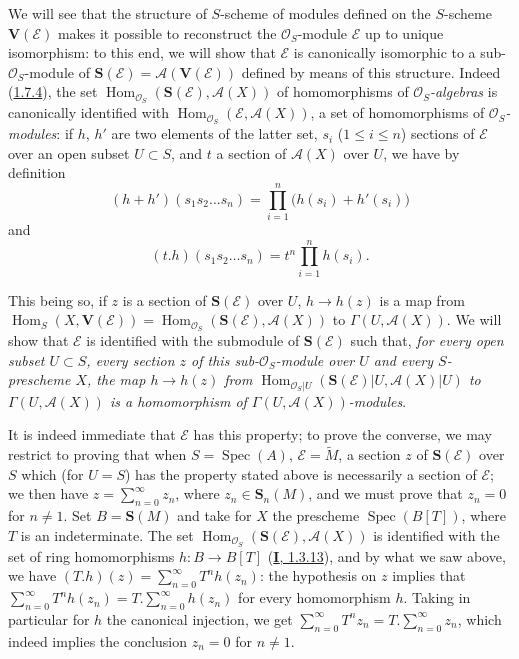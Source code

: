 \begin{env}[1.7.14]
\label{II.1.7.14}
We will see that the structure of $S$-scheme of modules defined on the
$S$-scheme $\mathbf{V}(\mathcal{E})$ makes it possible to reconstruct the
$\mathcal{O}_S$-module $\mathcal{E}$ up to unique isomorphism: to this
end, we will show that $\mathcal{E}$ is canonically isomorphic to a
sub-$\mathcal{O}_S$-module of
$\mathbf{S}(\mathcal{E})=\mathcal{A}(\mathbf{V}(\mathcal{E}))$ defined by
means of this structure. Indeed
(\hyperref[II.1.7.4]{1.7.4}), the set
$\operatorname{Hom}_{\mathcal{O}_S}(\mathbf{S}(\mathcal{E}),
\mathcal{A}(X))$ of homomorphisms of
\emph{$\mathcal{O}_S$-algebras} is canonically identified with
$\operatorname{Hom}_{\mathcal{O}_S}(\mathcal{E},\mathcal{A}(X))$, a set
of homomorphisms of \emph{$\mathcal{O}_S$-modules}: if $h$, $h'$ are two
elements of the latter set, $s_i$ ($1\leq i\leq n$) sections of
$\mathcal{E}$ over an open subset $U\subset S$, and $t$ a section of
$\mathcal{A}(X)$ over $U$, we have by definition
\[
  (h+h')(s_1s_2\ldots s_n)
  =\prod_{i=1}^n\bigl(h(s_i)+h'(s_i)\bigr)
\]
and
\[
  (t.h)(s_1s_2\ldots s_n)=t^n\prod_{i=1}^n h(s_i).
\]

This being so, if $z$ is a section of $\mathbf{S}(\mathcal{E})$ over
$U$, $h\to h(z)$ is a map from
$\operatorname{Hom}_S(X,\mathbf{V}(\mathcal{E}))
=\operatorname{Hom}_{\mathcal{O}_S}(\mathbf{S}(\mathcal{E}),
\mathcal{A}(X))$ to $\Gamma(U,\mathcal{A}(X))$. We will
show that $\mathcal{E}$ is identified with the submodule of
$\mathbf{S}(\mathcal{E})$ such that, \emph{for every open subset
$U\subset S$, every section $z$ of this sub-$\mathcal{O}_S$-module over $U$
and every $S$-prescheme $X$, the map $h\to h(z)$ from
$\operatorname{Hom}_{\mathcal{O}_S|U}(\mathbf{S}(\mathcal{E})|U,
\mathcal{A}(X)|U)$ to $\Gamma(U,\mathcal{A}(X))$ is a homomorphism of
$\Gamma(U,\mathcal{A}(X))$-modules}.

It is indeed immediate that $\mathcal{E}$ has this property; to prove
the converse, we may restrict to proving that when
$S=\operatorname{Spec}(A)$, $\mathcal{E}=\widetilde{M}$, a section $z$ of
$\mathbf{S}(\mathcal{E})$ over $S$ which (for $U=S$) has the property
stated above is necessarily a section of
$\mathcal{E}$; we then have $z=\sum_{n=0}^{\infty}z_n$, where
$z_n\in\mathbf{S}_n(M)$, and we must prove that $z_n=0$ for $n\ne1$.
Set $B=\mathbf{S}(M)$ and take for $X$ the prescheme
$\operatorname{Spec}(B[T])$, where $T$ is an indeterminate. The set
$\operatorname{Hom}_{\mathcal{O}_S}(\mathbf{S}(\mathcal{E}),
\mathcal{A}(X))$ is identified with the set of ring homomorphisms
$h:B\to B[T]$ (\hyperref[I.1.3.13]{\textbf{I}, 1.3.13}), and by what we saw
above, we have
$(T.h)(z)=\sum_{n=0}^{\infty}T^nh(z_n)$: the hypothesis on $z$ implies
that
$\sum_{n=0}^{\infty}T^nh(z_n)=T.\sum_{n=0}^{\infty}h(z_n)$ for every
homomorphism $h$. Taking in particular for $h$ the canonical injection, we
get $\sum_{n=0}^{\infty}T^nz_n=T.\sum_{n=0}^{\infty}z_n$, which indeed
implies the conclusion $z_n=0$ for $n\ne1$.
\end{env}

